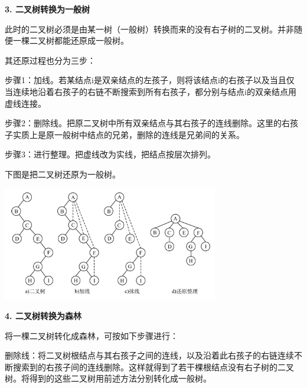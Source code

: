 {\textbf{3. 二叉树转换为一般树}}

{此时的二叉树必须是由某一树（一般树）转换而来的没有右子树的二叉树。并非随便一棵二叉树都能还原成一般树。}

{其还原过程也分为三步：}

{{步骤1：加线。}若某结点i是双亲结点的左孩子，则将该结点i的右孩子以及当且仅当连续地沿着右孩子的右链不断搜索到所有右孩子，都分别与结点i的双亲结点用虚线连接。}

{{步骤2：删除线。}把原二叉树中所有双亲结点与其右孩子的连线删除。这里的右孩子实质上是原一般树中结点的兄弟，删除的连线是兄弟间的关系。}

{{步骤3：进行整理。}把虚线改为实线，把结点按层次排列。}

{下图是把二叉树还原为一般树。}

{\includegraphics[width=3.70833in,height=1.95833in]{png-jpeg-pics/61F1D65B8B45C7E8E61FD9B3735B636C.png}\\
}

{}

{\textbf{4. 二叉树转换为森林}}

{将一棵二叉树转化成森林，可按如下步骤进行：}

{删除线：将二叉树根结点与其右孩子之间的连线，以及沿着此右孩子的右链连续不断搜索到的右孩子间的连线删除。这样就得到了若干棵根结点没有右子树的二叉树。将得到的这些二叉树用前述方法分别转化成一般树。}
